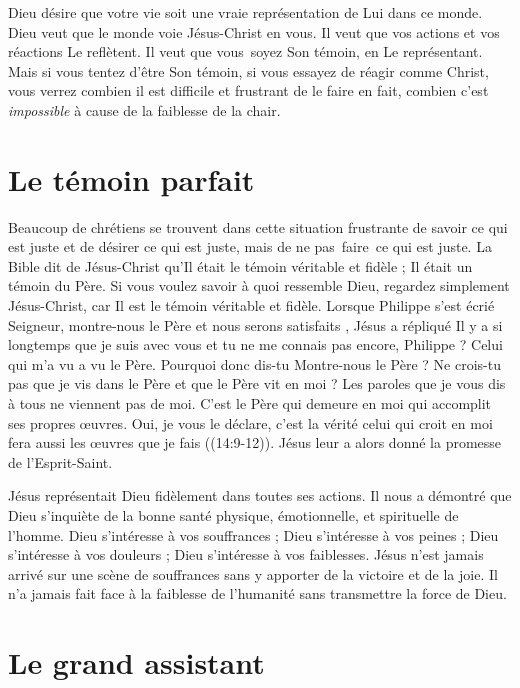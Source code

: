Dieu désire que votre vie soit une vraie représentation de Lui dans ce monde.
 Dieu veut que le monde voie Jésus-Christ en vous.
 Il veut que vos actions et vos réactions Le reflètent.
 Il veut que vous~soyez Son témoin, en Le représentant.
 Mais si vous tentez d'être Son témoin, si vous essayez de réagir comme Christ,
 vous verrez combien il est difficile et frustrant de le faire
 \ocadr en fait, combien c'est \emph{impossible}
 à cause de la faiblesse de la chair.

\section{Le t\'emoin parfait}

Beaucoup de chrétiens se trouvent dans cette situation frustrante de savoir
 ce qui est juste et de désirer ce qui est juste, mais de ne pas~faire~ce
 qui est juste.
 La Bible dit de Jésus-Christ qu'Il était le témoin véritable et fidèle ;
 Il était un témoin du Père.
 Si vous voulez savoir à quoi ressemble Dieu, regardez simplement
 Jésus-Christ, car Il est le témoin véritable et fidèle.
 Lorsque Philippe s'est écrié\frcolon{}
 \Og Seigneur, montre-nous le Père et nous serons satisfaits \Fg{},
 Jésus a répliqué\frcolon{}
 \Og Il y a si longtemps que je suis avec vous et tu ne me connais pas encore,
 Philippe ? Celui qui m'a vu a vu le Père. Pourquoi donc dis-tu\frcolon{}
 \Og Montre-nous le Père \Fg{} ?
 Ne crois-tu pas que je vis dans le Père et que le Père vit en moi ?
 Les paroles que je vous dis à tous ne viennent pas de moi.
 C'est le Père qui demeure en moi qui accomplit ses propres œuvres.
 Oui, je vous le déclare, c'est la vérité\frcolon{}
 celui qui croit en moi fera aussi les œuvres que je fais \Fg{}
 ((14:9-12)). Jésus leur a alors donné la promesse
 de l'Esprit-Saint.

Jésus représentait Dieu fidèlement dans toutes ses actions.
 Il nous a démontré que Dieu s'inquiète de la bonne santé physique,
 émotionnelle, et spirituelle de l'homme.
 Dieu s'intéresse à vos souffrances ; Dieu s'intéresse à vos peines ;
 Dieu s'intéresse à vos douleurs ; Dieu s'intéresse à vos faiblesses.
 Jésus n'est jamais arrivé sur une scène de souffrances sans y apporter
 de la victoire et de la joie. Il n'a jamais fait face à la faiblesse
 de l'humanité sans transmettre la force de Dieu.

\section{Le grand assistant}

